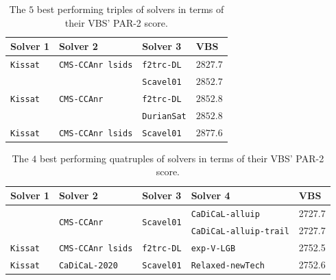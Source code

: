 \documentclass{elsarticle}
\newcommand{\solver}[1]{\texttt{#1}}
\begin{document}
\begin{table}[tb]
\centering
\begin{tabular}{llll}
\bf Solver 1 & \bf Solver 2 & \bf Solver 3 & \bf VBS\\
\hline\arrayrulecolor{lightgray}
\solver{Kissat} & \solver{CMS-CCAnr lsids} & \solver{f2trc-DL} & $2827.7$\\
\hline
\multirow{3}{*}{\solver{Kissat}} & \multirow{3}{*}{\solver{CMS-CCAnr}} & \solver{Scavel01} & $2852.7$\\
 &  & \solver{f2trc-DL} & $2852.8$\\
 &  & \solver{DurianSat} & $2852.8$\\
\hline
\solver{Kissat} & \solver{CMS-CCAnr lsids} & \solver{Scavel01}& $2877.6$\\
\end{tabular}
\caption{The $5$ best performing triples of solvers in terms of their VBS' PAR-2 score.}
\label{tab:best-triples}
\end{table}

\begin{table}[tb]
\centering
\setlength\tabcolsep{4.5pt}
\begin{tabular}{lllll}
\bf Solver 1 & \bf Solver 2 & \bf Solver 3 & \bf Solver 4 & \bf VBS\\
\hline\arrayrulecolor{lightgray}
\multirow{2}{*}{\solver{Kissat}} & \multirow{2}{*}{\solver{CMS-CCAnr}} & \multirow{2}{*}{\solver{Scavel01}} & \solver{CaDiCaL-alluip} & 2727.7\\
 &  &  & \solver{CaDiCaL-alluip-trail} & 2727.7\\
\hline
\solver{Kissat} & \solver{CMS-CCAnr lsids} & \solver{f2trc-DL} & \solver{exp-V-LGB} & 2752.5\\
\hline
\solver{Kissat} & \solver{CaDiCaL-2020} & \solver{Scavel01} & \solver{Relaxed-newTech} & 2752.6\\
\end{tabular}
\caption{The $4$ best performing quatruples of solvers in terms of their VBS' PAR-2 score.}
\label{tab:best-quatruples}
\end{table}
\end{document}
